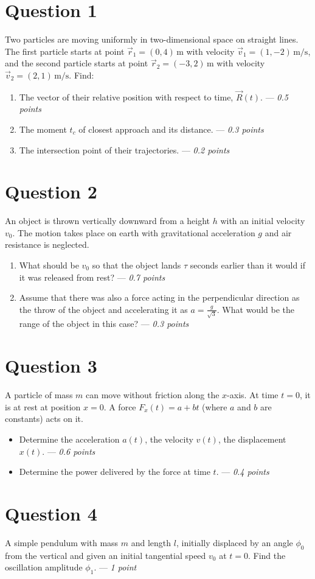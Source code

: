 \documentclass[a4paper,12pt]{article}
\begin{document}
\section*{Question 1}
Two particles are moving uniformly in two-dimensional space on straight lines. The first particle starts at point $\vec{r}_1 = (0, 4) \, \text{m}$ with velocity $\vec{v}_1 = (1, -2) \, \text{m/s}$, and the second particle starts at point $\vec{r}_2 = (-3, 2) \, \text{m}$ with velocity $\vec{v}_2 = (2, 1) \, \text{m/s}$. Find:
\begin{enumerate}
    \item[(a)] The vector of their relative position with respect to time, $\vec{R}(t)$. --- \textit{0.5 points}
    \item[(b)] The moment $t_c$ of closest approach and its distance. --- \textit{0.3 points}
    \item[(c)] The intersection point of their trajectories. --- \textit{0.2 points}
\end{enumerate}




\section*{Question 2}
An object is thrown vertically downward from a height $h$ with an initial velocity $v_0$. The motion takes place on earth with gravitational acceleration $g$ and air resistance is neglected.
\begin{enumerate}
    \item[(a)] What should be $v_0$ so that the object lands $\tau$ seconds earlier than it would if it was released from rest? --- \textit{0.7 points}
    \item[(b)] Assume that there was also a force acting in the perpendicular direction as the throw of the object and accelerating it as $a=\frac{g}{\sqrt{3}}$. What would be the range of the object in this case? --- \textit{0.3 points}
\end{enumerate}

\section*{Question 3}
A particle of mass $m$ can move without friction along the  $x$-axis. At time $t = 0$, it is at rest at position $x = 0$. A force $F_x(t) = a + bt$ (where $a$ and $b$ are constants) acts on it. 
\begin{itemize}
    \item[(a)] Determine the acceleration $a(t)$, the velocity $v(t)$, the displacement $x(t)$. --- \textit{0.6 points}
    \item[(b)] Determine the power delivered by the force at time $t$. --- \textit{0.4 points}
\end{itemize}

\section*{Question 4}
A simple pendulum with mass $m$ and length $l$, initially displaced by an angle $\phi_0$ from the vertical and given an initial tangential speed $v_0$ at $t = 0$. Find the oscillation amplitude $\phi_1$. --- \textit{1 point}
\end{document}
